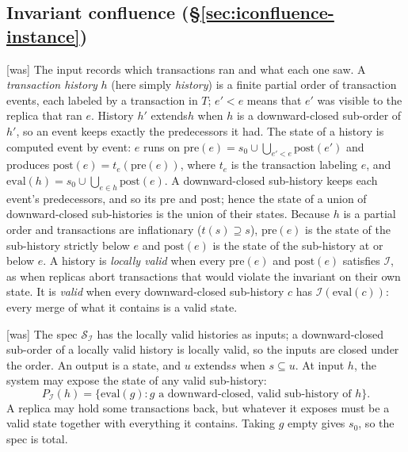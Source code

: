 \documentclass[sigconf]{cidr-2027}
\theoremstyle{remark}
\newcommand{\inrel}{extends\xspace}          %
\newcommand{\outrel}{extends\xspace}          %
\newcommand{\Spec}{\mathcal{S}}
\begin{document}
\subsection{Invariant confluence (\S\ref{sec:iconfluence-instance})}
\label{app:iconfluence}



{\footnotesize\color{black!50}\noindent\textsf{[was]} The input records which transactions ran and what each one saw.  A
\emph{transaction history} $h$ (here simply \emph{history}) is a finite partial order of transaction events, each
labeled by a transaction in $T$; $e'<e$ means that $e'$ was visible to the
replica that ran $e$.  History $h'$ \inrel $h$ when $h$ is a downward-closed
sub-order of $h'$, so an event keeps exactly the predecessors it had.  The
state of a history is computed event by event: $e$ runs on
$\mathrm{pre}(e)=s_0\cup\bigcup_{e'<e}\mathrm{post}(e')$ and produces
$\mathrm{post}(e)=t_e(\mathrm{pre}(e))$, where $t_e$ is the transaction labeling $e$, and
$\mathrm{eval}(h)=s_0\cup\bigcup_{e\in h}\mathrm{post}(e)$.  A
downward-closed sub-history keeps each event's predecessors, and so its
$\mathrm{pre}$ and $\mathrm{post}$; hence the state of a union of
downward-closed sub-histories is the union of their states.  Because
$h$ is a partial order and transactions are inflationary ($t(s)\supseteq
s$), $\mathrm{pre}(e)$ is the state of the sub-history strictly below $e$ and
$\mathrm{post}(e)$ is the state of the sub-history at or below $e$.  A history is \emph{locally valid}
when every $\mathrm{pre}(e)$ and $\mathrm{post}(e)$ satisfies $\mathcal I$, as
when replicas abort transactions that would violate the invariant on their own
state.  It is \emph{valid} when every downward-closed sub-history $c$ has
$\mathcal I(\mathrm{eval}(c))$: every merge of what it contains is a valid
state.\par}



{\footnotesize\color{black!50}\noindent\textsf{[was]} The spec $\Spec_{\mathcal I}$ has the locally valid histories as inputs;
a downward-closed sub-order of a locally valid history is locally valid, so the
inputs are closed under the order.
An output is a state, and $u$ \outrel $s$ when $s\subseteq u$.  At input $h$,
the system may expose the state of any valid sub-history:
\[
  P_{\mathcal I}(h)=\{\mathrm{eval}(g):g\text{ a downward-closed, valid
  sub-history of }h\}.
\]
A replica may hold some transactions back, but whatever it exposes must be a
valid state together with everything it contains.  Taking $g$ empty gives
$s_0$, so the spec is total.\par}
\end{document}
